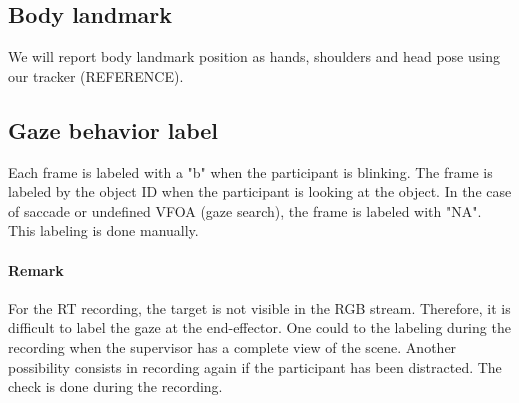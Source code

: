 \documentclass[11pt,a4paper]{article}
\begin{document}
\subsection{Body landmark}
We will report body landmark position as hands, shoulders and head pose using our tracker (REFERENCE).

\subsection{Gaze behavior label}
Each frame is labeled with a "b" when the participant is blinking. The frame is labeled by the object ID when the participant is looking at the object. In the case of saccade or undefined VFOA (gaze search), the frame is labeled with "NA". This labeling is done manually. 
\paragraph{Remark}
For the RT recording, the target is not visible in the RGB stream. Therefore, it is difficult to label the gaze at the end-effector. One could to the labeling during the recording when the supervisor has a complete view of the scene. Another possibility consists in recording again if the participant has been distracted. The check is done during the recording.
\end{document}
